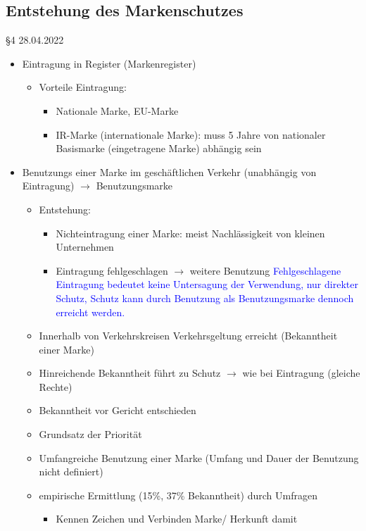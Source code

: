 \documentclass{report}
\begin{document}
\subsection{Entstehung des Markenschutzes} §4
28.04.2022
\begin{itemize}
	\item Eintragung in Register (Markenregister)
	\begin{itemize}
		\item Vorteile Eintragung:
		\begin{itemize}
			\item Nationale Marke, EU-Marke
			\item IR-Marke (internationale Marke): muss 5 Jahre von nationaler Basismarke (eingetragene Marke) abhängig sein
		\end{itemize}
	\end{itemize}
	\item Benutzungs einer Marke im geschäftlichen Verkehr (unabhängig von Eintragung)
	\newline $\rightarrow$ Benutzungsmarke
	\begin{itemize}
		\item Entstehung:
		\begin{itemize}
			\item Nichteintragung einer Marke: meist Nachlässigkeit von kleinen Unternehmen
			\item Eintragung fehlgeschlagen $\rightarrow$ weitere Benutzung
			\newline \textcolor{blue}{Fehlgeschlagene Eintragung bedeutet keine Untersagung der Verwendung, nur direkter Schutz, Schutz kann durch Benutzung als Benutzungsmarke dennoch erreicht werden.}
		\end{itemize}
		\item Innerhalb von Verkehrskreisen Verkehrsgeltung erreicht (Bekanntheit einer Marke)
		\item Hinreichende Bekanntheit führt zu Schutz $\rightarrow$ wie bei Eintragung (gleiche Rechte)
		\item Bekanntheit vor Gericht entschieden
		\item Grundsatz der Priorität
		\item Umfangreiche Benutzung einer Marke (Umfang und Dauer der Benutzung nicht definiert)
		\item empirische Ermittlung (15\%, 37\% Bekanntheit) durch Umfragen
		\begin{itemize}
			\item Kennen Zeichen und Verbinden Marke/ Herkunft damit

\end{itemize}
\end{itemize}
\end{itemize}
\end{document}
